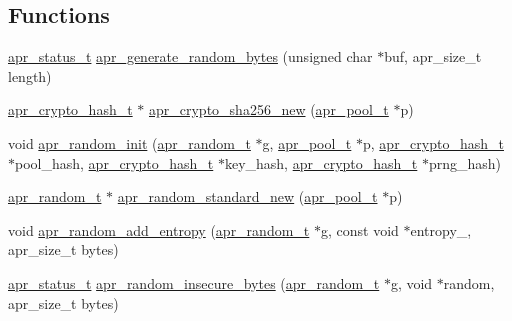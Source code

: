 \subsection*{Functions}
\begin{DoxyCompactItemize}
\item 
\hyperlink{group__apr__errno_gaf76ee4543247e9fb3f3546203e590a6c}{apr\-\_\-status\-\_\-t} \hyperlink{group__apr__random_ga564e4c380e820a9b0d9e877d4852a65e}{apr\-\_\-generate\-\_\-random\-\_\-bytes} (unsigned char $\ast$buf, apr\-\_\-size\-\_\-t length)
\item 
\hyperlink{structapr__crypto__hash__t}{apr\-\_\-crypto\-\_\-hash\-\_\-t} $\ast$ \hyperlink{group__apr__random_gae992c6f642e9661d2417cd8f2df8d345}{apr\-\_\-crypto\-\_\-sha256\-\_\-new} (\hyperlink{group__apr__pools_gaf137f28edcf9a086cd6bc36c20d7cdfb}{apr\-\_\-pool\-\_\-t} $\ast$p)
\item 
void \hyperlink{group__apr__random_ga0184a90774212132f883c463811aacdc}{apr\-\_\-random\-\_\-init} (\hyperlink{group__apr__random_ga33073741e56b1bafe52ba58cefcbbf96}{apr\-\_\-random\-\_\-t} $\ast$g, \hyperlink{group__apr__pools_gaf137f28edcf9a086cd6bc36c20d7cdfb}{apr\-\_\-pool\-\_\-t} $\ast$p, \hyperlink{structapr__crypto__hash__t}{apr\-\_\-crypto\-\_\-hash\-\_\-t} $\ast$pool\-\_\-hash, \hyperlink{structapr__crypto__hash__t}{apr\-\_\-crypto\-\_\-hash\-\_\-t} $\ast$key\-\_\-hash, \hyperlink{structapr__crypto__hash__t}{apr\-\_\-crypto\-\_\-hash\-\_\-t} $\ast$prng\-\_\-hash)
\item 
\hyperlink{group__apr__random_ga33073741e56b1bafe52ba58cefcbbf96}{apr\-\_\-random\-\_\-t} $\ast$ \hyperlink{group__apr__random_ga7a73c9bcf026b63847aeae483c53191f}{apr\-\_\-random\-\_\-standard\-\_\-new} (\hyperlink{group__apr__pools_gaf137f28edcf9a086cd6bc36c20d7cdfb}{apr\-\_\-pool\-\_\-t} $\ast$p)
\item 
void \hyperlink{group__apr__random_ga8cf2875644c1dffc0c336289bd370efb}{apr\-\_\-random\-\_\-add\-\_\-entropy} (\hyperlink{group__apr__random_ga33073741e56b1bafe52ba58cefcbbf96}{apr\-\_\-random\-\_\-t} $\ast$g, const void $\ast$entropy\-\_\-, apr\-\_\-size\-\_\-t bytes)
\item 
\hyperlink{group__apr__errno_gaf76ee4543247e9fb3f3546203e590a6c}{apr\-\_\-status\-\_\-t} \hyperlink{group__apr__random_gab9a63359bb9543d746e6fd46933b7256}{apr\-\_\-random\-\_\-insecure\-\_\-bytes} (\hyperlink{group__apr__random_ga33073741e56b1bafe52ba58cefcbbf96}{apr\-\_\-random\-\_\-t} $\ast$g, void $\ast$random, apr\-\_\-size\-\_\-t bytes)
\item 

\end{DoxyCompactItemize}
